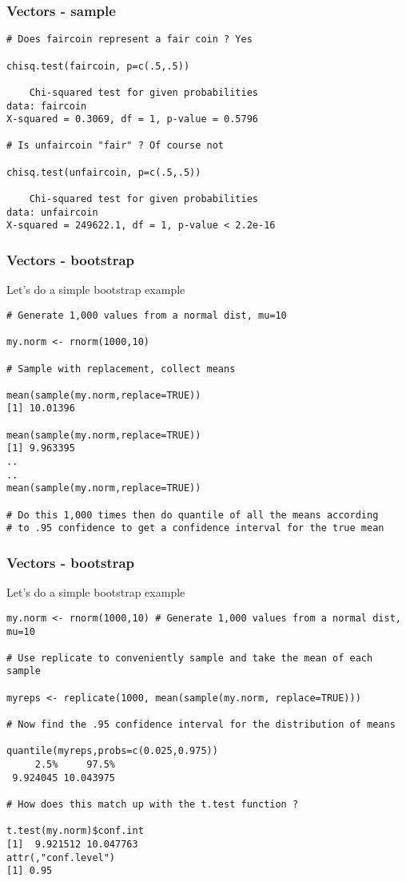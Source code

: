 \documentclass{beamer}
\begin{document}
%
\begin{frame}[fragile]
\frametitle{Vectors - sample}

\footnotesize
\begin{verbatim}
# Does faircoin represent a fair coin ? Yes

chisq.test(faircoin, p=c(.5,.5))

    Chi-squared test for given probabilities
data: faircoin
X-squared = 0.3069, df = 1, p-value = 0.5796

# Is unfaircoin "fair" ? Of course not

chisq.test(unfaircoin, p=c(.5,.5))

    Chi-squared test for given probabilities
data: unfaircoin
X-squared = 249622.1, df = 1, p-value < 2.2e-16
\end{verbatim}
\end{frame}

%

%
\begin{frame}[fragile]
\frametitle{Vectors - bootstrap}
Let's do a simple bootstrap example
\footnotesize
\begin{verbatim}
# Generate 1,000 values from a normal dist, mu=10

my.norm <- rnorm(1000,10)

# Sample with replacement, collect means

mean(sample(my.norm,replace=TRUE))
[1] 10.01396

mean(sample(my.norm,replace=TRUE))
[1] 9.963395
..
..
mean(sample(my.norm,replace=TRUE))

# Do this 1,000 times then do quantile of all the means according
# to .95 confidence to get a confidence interval for the true mean
\end{verbatim}
\end{frame}

%
\begin{frame}[fragile]
\frametitle{Vectors - bootstrap}
Let's do a simple bootstrap example
\footnotesize
\begin{verbatim}
my.norm <- rnorm(1000,10) # Generate 1,000 values from a normal dist, mu=10

# Use replicate to conveniently sample and take the mean of each sample

myreps <- replicate(1000, mean(sample(my.norm, replace=TRUE)))

# Now find the .95 confidence interval for the distribution of means

quantile(myreps,probs=c(0.025,0.975))
     2.5%     97.5% 
 9.924045 10.043975 

# How does this match up with the t.test function ? 

t.test(my.norm)$conf.int
[1]  9.921512 10.047763
attr(,"conf.level")
[1] 0.95
\end{verbatim}
\end{frame}
\end{document}
